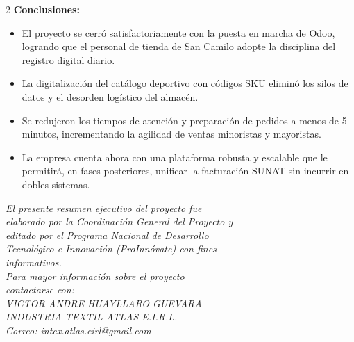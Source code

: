 \documentclass[12pt]{article}
\begin{document}
\begin{multicols}{2}
\textbf{Conclusiones:}
\begin{itemize}
    \item El proyecto se cerró satisfactoriamente con la puesta en marcha de Odoo, logrando que el personal de tienda de San Camilo adopte la disciplina del registro digital diario.
    \item La digitalización del catálogo deportivo con códigos SKU eliminó los silos de datos y el desorden logístico del almacén.
    \item Se redujeron los tiempos de atención y preparación de pedidos a menos de 5 minutos, incrementando la agilidad de ventas minoristas y mayoristas.
    \item La empresa cuenta ahora con una plataforma robusta y escalable que le permitirá, en fases posteriores, unificar la facturación SUNAT sin incurrir en dobles sistemas.
\end{itemize}

\vspace{0.4cm}
\noindent
\scriptsize
\renewcommand{\arraystretch}{1.15}
\setlength{\tabcolsep}{3pt}
\normalsize

\vspace{0.25cm}
\begin{center}
\scriptsize\itshape
El presente resumen ejecutivo del proyecto fue\\
elaborado por la Coordinación General del Proyecto y\\
editado por el Programa Nacional de Desarrollo\\
Tecnológico e Innovación (ProInnóvate) con fines\\
informativos.\\[0.2cm]
Para mayor información sobre el proyecto\\
contactarse con:\\\relax
VICTOR ANDRE HUAYLLARO GUEVARA\\\relax
INDUSTRIA TEXTIL ATLAS E.I.R.L.\\
Correo: intex.atlas.eirl@gmail.com
\end{center}
\end{multicols}
\end{document}
